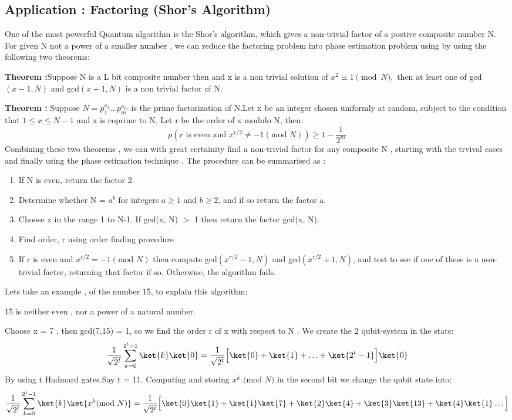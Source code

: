 \subsection{Application : Factoring (Shor's Algorithm)}
One of the most powerful Quantum algorithm is the Shor's algorithm, which gives a non-trivial factor of a postive composite number N. For given N not a power of a smaller number , we can reduce the factoring problem into phase estimation problem using by using the following two theorems:\par
\textbf{Theorem :}Suppose N is a L bit composite number then and x is a non trivial solution of $x^2 \equiv 1 \pmod{N},$ then at least one of gcd$(x-1,N)$ and gcd$(x+1,N)$ is a non trivial factor of N.
\newline \par
\textbf{Theorem :} Suppose $N = p_1^{a_1}\hdots p_m^{a_m}$ is the prime factorization of N.Let x be an integer chosen uniformly at random, subject to the condition that $1\leq x \leq N-1$ and x is coprime to N. Let r be the order of x modulo N, then:
$$ p(r \text{ is even and } x^{r/2} \neq  -1(\text{mod }N)) \geq 1 - \frac{1}{2^m}$$
Combining these two theorems , we can with great certainity find a non-trivial factor for any composite N , starting with the trvival cases and finally using the phase estimation technique . The procedure can be summarised as :
\begin{enumerate}
\item  If N is even, return the factor 2.
\item Determine whether N = $a^b$ for integers  $a\geq1$  and $b \geq 2$, and if so return the factor a.
\item Choose x in the range 1 to N-1. If gcd(x, N) $>$ 1 then return the factor gcd(x, N).
\item Find order, r using order finding procedure
\item If r is even and $x^{r/2} = -1(\text{mod }N)$ then compute gcd$(x^{r/2}  -1, N)$ and gcd$(x^{r/2} + 1, N)$, and test to see if one of these is a non-trivial factor, returning that factor if so. Otherwise, the algorithm fails.
\end{enumerate}
Lets take an example , of the number 15, to explain this algorithm:
\item 15 is neither even , nor a power of a natural number.
\item Choose x = 7 , then gcd(7,15) = 1, so we find the order r of x with respect to N . We create the 2 qubit-system in the state:
$$\frac{1}{\sqrt{2^t}}\sum_{k=0}^{2^{t}-1}\ket{k}\ket{0} = \frac{1}{\sqrt{2^t}}\Big[\ket{0} + \ket{1} + \hdots + \ket{2^t-1} \Big]\ket{0}$$
By using t Hadmard gates.Say t = 11. Computing and storing $x^k \text{ (mod }N)$ in the second bit we change the qubit state into:
$$\frac{1}{\sqrt{2^t}}\sum_{k=0}^{2^t-1}\ket{k}\ket{x^k (\text{mod }N)} = 
\frac{1}{\sqrt{2^{t}}}\Big[\ket{0}\ket{1} + \ket{1}\ket{7} + \ket{2}\ket{4} + \ket{3}\ket{13}+\ket{4}\ket{1} \hdots  \Big]
$$

